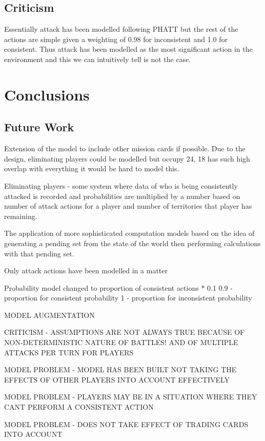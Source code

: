 \documentclass[parskip]{cs4rep}
\begin{document}
\section{Criticism}

Essentially attack has been modelled following PHATT but the rest of the actions are simple given a weighting of 0.98 for inconsistent and 1.0 for consistent. Thus attack has been modelled as the most significant action in the environment and this we can intuitively tell is not the case.

\chapter{Conclusions}

\section{Future Work}

Extension of the model to include other mission cards if possible. Due to the design, eliminating players could be modelled but occupy 24, 18 has such high overlap with everything it would be hard to model this.

Eliminating players - some system where data of who is being consistently attacked is recorded and probabilities are multiplied by a number based on number of attack actions for a player and number of territories that player has remaining.

The application of more sophisticated computation models based on the idea of generating a pending set from the state of the world then performing calculations with that pending set.

Only attack actions have been modelled in a matter 

Probability model changed to proportion of consistent actions * 0.1 
0.9 - proportion for consistent probability
1 - proportion for inconsistent probability

MODEL AUGMENTATION

CRITICISM - ASSUMPTIONS ARE NOT ALWAYS TRUE BECAUSE OF NON-DETERMINISTIC NATURE OF BATTLES! AND OF MULTIPLE ATTACKS PER TURN FOR PLAYERS

MODEL PROBLEM - MODEL HAS BEEN BUILT NOT TAKING THE EFFECTS OF OTHER PLAYERS INTO ACCOUNT EFFECTIVELY

MODEL PROBLEM - PLAYERS MAY BE IN A SITUATION WHERE THEY CANT PERFORM A CONSISTENT ACTION

MODEL PROBLEM - DOES NOT TAKE EFFECT OF TRADING CARDS INTO ACCOUNT
\end{document}
